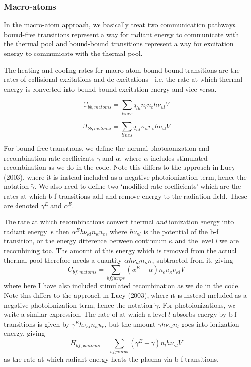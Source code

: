 \subsubsection{Macro-atoms}

\noindent
In the macro-atom approach, we basically treat two communication pathways.
bound-free transitions represent a way
for radiant energy to communicate with the thermal pool
and bound-bound transitions represent a way
for excitation energy to communicate with the thermal pool.
\bigskip

\noindent
The heating and cooling rates for macro-atom bound-bound transitions are the rates of
collisional excitations and de-excitations
- i.e. the rate at which thermal energy is converted into
bound-bound excitation energy and vice versa.

\begin{equation}
C_{bb,matoms} = \sum_{lines} q_{lu} n_l n_e h \nu_{ul} V
\end{equation}

\begin{equation}
H_{bb,matoms} = \sum_{lines} q_{ul} n_u n_e h \nu_{ul} V
\end{equation}

\noindent
For bound-free transitions, we define the normal photoionization and recombination
rate coefficients $\gamma$ and $\alpha$, where $\alpha$ includes
stimulated recombination as we do in the code. Note
this differs to the approach in Lucy (2003), where it is instead included as a 
negative photoionization term, hence the notation $\widetilde{\gamma}$.
We also need to define two `modified rate coefficients' which 
are the rates at which b-f transitions add and remove energy to the radiation field.
These are denoted $\gamma^E$ and $\alpha^E$.

The rate at which recombinations convert
thermal {\em and} ionization energy into radiant energy is then
$\alpha^E h\nu_{\kappa l} n_\kappa n_e$, where $h \nu_{\kappa l}$ is the potential of the 
b-f transition, or the energy difference between continuum $\kappa$ and 
the level $l$ we are recombining too. 
The amount of this energy which is removed from the actual thermal pool
therefore needs a quantity $\alpha h\nu_{\kappa l} n_\kappa n_e$ subtracted from it,
giving
\begin{equation}
C_{bf,matoms} = \sum_{bf jumps} (\alpha^E - \alpha) n_e n_{\kappa}\nu_{\kappa l} V 
\end{equation}
where here I have also included stimulated recombination as we do in the code. Note
this differs to the approach in Lucy (2003), where it is instead included as a 
negative photoionization term, hence the notation $\widetilde{\gamma}$.
For photoionizations, we write a similar expression. The rate of at which
a level $l$ absorbs energy by b-f transitions is given by $\gamma^E h\nu_{\kappa l} n_\kappa n_e$,
but the amount $\gamma h \nu_{\kappa l} n_l$ goes into ionization energy, giving 
\begin{equation}
H_{bf,matoms} = \sum_{bf jumps} (\gamma^E - \gamma) n_l h \nu_{\kappa l} V
\end{equation}
as the rate at which radiant energy heats the plasma via b-f transitions.





